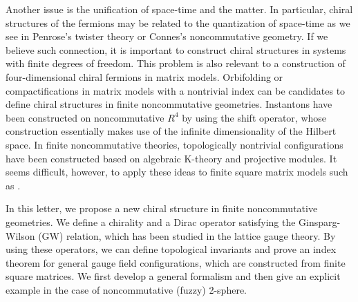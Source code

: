 \documentclass[a4paper,prl,showpacs,twocolumn]{revtex4}
\begin{document}
Another issue is the unification of space-time and the matter.
In particular, chiral structures of the fermions may 
be related to the quantization of space-time as we see in 
Penrose's twister theory or Connes's noncommutative geometry.
If we believe such connection, it is important to construct
chiral structures in systems with finite degrees of freedom.
This problem is also relevant to a construction of  four-dimensional
chiral fermions in matrix models.
Orbifolding\cite{AIS} or compactifications 
in matrix models with a nontrivial index 
can be candidates to define chiral structures in finite 
noncommutative geometries.
Instantons have been constructed
on noncommutative $R^4$ by using the shift 
operator\cite{instanton,harvey}, 
whose construction  essentially makes use of the infinite 
dimensionality of the Hilbert space.
In finite noncommutative theories, topologically nontrivial 
configurations have been constructed based on algebraic 
K-theory and projective modules\cite{Connes,balatop}. 
It seems difficult, however, to apply these ideas to finite 
square matrix models such as \cite{IKKT}.
\par
In this letter, we propose a new chiral structure in finite
noncommutative geometries. We define a chirality and a Dirac
operator satisfying the Ginsparg-Wilson (GW) relation, which 
has been studied in the lattice gauge theory.
By using these operators, we can define  topological invariants
and prove an index theorem for general gauge field 
configurations, which are constructed from finite square 
matrices.
We first develop a general formalism and then give an explicit
example in the case of noncommutative (fuzzy) 2-sphere.
\end{document}
